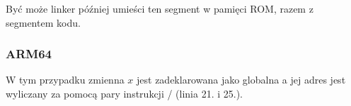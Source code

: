 Być może linker później umieści ten segment w pamięci ROM, razem z segmentem kodu.

\subsubsection{ARM64}




W tym przypadku zmienna $x$ jest zadeklarowana jako globalna a jej adres jest wyliczany za pomocą pary instrukcji / (linia 21. i 25.).

